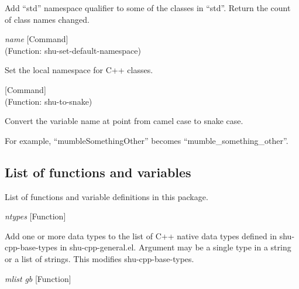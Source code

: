 \begin{doc-string}
Add ``std'' namespace qualifier to some of the classes in ``std''.  Return the
count of class names changed.
\end{doc-string}

\vspace{1em}
\noindent
{}
\usebox{\funcname}\emph{name}
 \hfill [Command]\\%
 (Function: shu-set-default-namespace)

\begin{doc-string}
Set the local namespace for C++ classes.
\end{doc-string}

\vspace{1em}
\noindent
{}
\usebox{\funcname}
 \hfill [Command]\\%
 (Function: shu-to-snake)

\begin{doc-string}
Convert the variable name at point from camel case to snake case.

For example, ``mumbleSomethingOther'' becomes ``mumble\_something\_other''.
\end{doc-string}

\subsection{List of functions and variables}

List of functions and variable definitions in this package.



\vspace{1em}
\noindent
{}
\usebox{\funcname}\emph{ntypes}
 \hfill [Function]

\begin{doc-string}
Add one or more data types to the list of C++ native data types defined in shu-cpp-base-types
in shu-cpp-general.el.  Argument may be a single type in a string or a list of strings.
This modifies shu-cpp-base-types.
\end{doc-string}

\vspace{1em}
\noindent
{}
\usebox{\funcname}\emph{mlist} \emph{gb}
 \hfill [Function]

